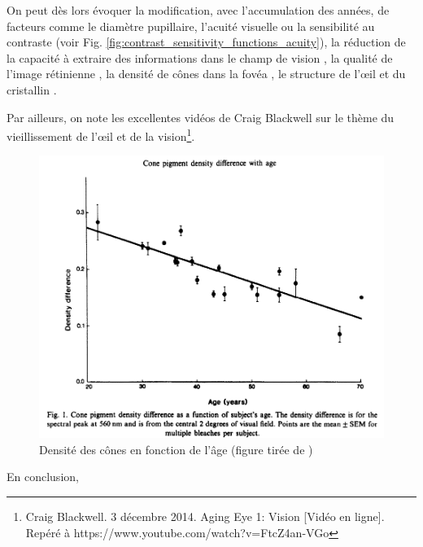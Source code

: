	\par On peut dès lors évoquer la modification, avec l'accumulation des années, de facteurs comme le diamètre pupillaire, l'acuité visuelle ou la sensibilité au contraste \citep{owsley_contrast_1983} (voir Fig. \ref{fig:contrast_sensitivity_functions_acuity}), la réduction de la capacité à extraire des informations dans le champ de vision \citep{sekuler_effects_2000,ball_age_1988,roge_influence_2004, roge_deterioration_2009,gross_human_2008}, la qualité de l'image rétinienne \citep{artal_effects_1993}, la densité de cônes dans la fovéa \citep{kilbride_foveal_1986}, le structure de l'œil et du cristallin \citep{cook_aging_1994}.
	
	\par Par ailleurs, on note les excellentes vidéos de Craig Blackwell sur le thème du vieillissement de l'œil et de la vision\footnote{Craig Blackwell. 3 décembre 2014. Aging Eye 1: Vision [Vidéo en ligne]. Repéré à https://www.youtube.com/watch?v=FtcZ4an-VGo}.
	
	\begin{figure}
		\centering
		\includegraphics[scale=.5]{Figures/ConeDensityAge}
		\caption{Densité des cônes en fonction de l'âge (figure tirée de \citep{kilbride_foveal_1986})}
		\label{fig:densite_cones_age}
	\end{figure}
	
	\par En conclusion, 